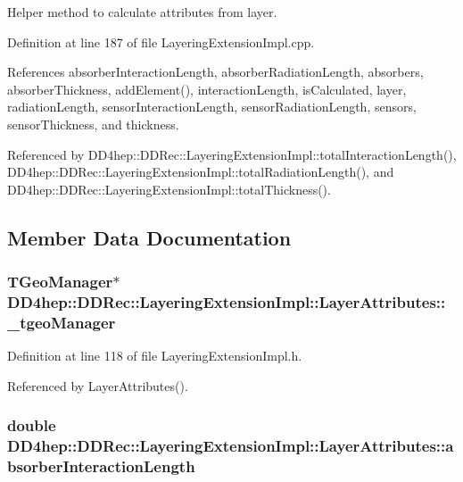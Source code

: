 Helper method to calculate attributes from layer. 

Definition at line 187 of file LayeringExtensionImpl.cpp.

References absorberInteractionLength, absorberRadiationLength, absorbers, absorberThickness, addElement(), interactionLength, isCalculated, layer, radiationLength, sensorInteractionLength, sensorRadiationLength, sensors, sensorThickness, and thickness.

Referenced by DD4hep::DDRec::LayeringExtensionImpl::totalInteractionLength(), DD4hep::DDRec::LayeringExtensionImpl::totalRadiationLength(), and DD4hep::DDRec::LayeringExtensionImpl::totalThickness().

\subsection{Member Data Documentation}
\hypertarget{struct_d_d4hep_1_1_d_d_rec_1_1_layering_extension_impl_1_1_layer_attributes_a14263508e7633f4d41ea796eea116f1e}{
\subsubsection[{\_\-tgeoManager}]{\setlength{\rightskip}{0pt plus 5cm}TGeoManager$\ast$ {\bf DD4hep::DDRec::LayeringExtensionImpl::LayerAttributes::\_\-tgeoManager}}}
\label{struct_d_d4hep_1_1_d_d_rec_1_1_layering_extension_impl_1_1_layer_attributes_a14263508e7633f4d41ea796eea116f1e}


Definition at line 118 of file LayeringExtensionImpl.h.

Referenced by LayerAttributes().\hypertarget{struct_d_d4hep_1_1_d_d_rec_1_1_layering_extension_impl_1_1_layer_attributes_a9c544a56690f13249e4cfb943fb9d11e}{
\subsubsection[{absorberInteractionLength}]{\setlength{\rightskip}{0pt plus 5cm}double {\bf DD4hep::DDRec::LayeringExtensionImpl::LayerAttributes::absorberInteractionLength}}}
\label{struct_d_d4hep_1_1_d_d_rec_1_1_layering_extension_impl_1_1_layer_attributes_a9c544a56690f13249e4cfb943fb9d11e}


